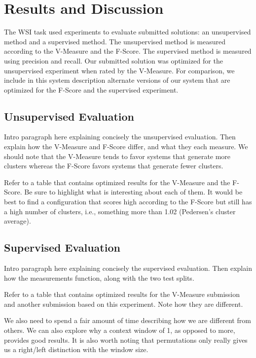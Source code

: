 \documentclass[11pt]{article}
\begin{document}
\section{Results and Discussion}

The WSI task used experiments to evaluate submitted solutions: an unsupervised
method and a supervised method.  The unsupervised method is measured according
to the V-Measure and the F-Score.  The supervised method is measured using
precision and recall.  Our submitted solution was optimized for the unsupervised
experiment when rated by the V-Measure.  For comparison, we include in this
system description alternate versions of our system that are optimized for the
F-Score and the supervised experiment.

\subsection{Unsupervised Evaluation}

Intro paragraph here explaining concisely the unsupervised evaluation.  Then
explain how the V-Measure \cite{rosenberg07vmeasure} and F-Score differ, and
what they each measure.  We should note that the V-Measure tends to favor
systems that generate more clusters whereas the F-Score favors systems that
generate fewer clusters. 

Refer to a table that contains optimized results for the V-Measure and the
F-Score.  Be sure to highlight what is interesting about each of them.  It would
be best to find a configuration that scores high according to the F-Score but
still has a high number of clusters, i.e., something more than 1.02 (Pedersen's
cluster average).

\subsection{Supervised Evaluation}

Intro paragraph here explaining concisely the supervised evaluation.  Then
explain how the measurements function, along with the two test splits.  

Refer to a table that contains optimized results for the V-Measure submission
and another submission based on this experiment.  Note how they are different.

We also need to spend a fair amount of time describing how we are different from
others.  We can also explore why a context window of 1, as opposed to more,
provides good results.  It is also worth noting that permutations only really
gives us a right/left distinction with the window size.
\end{document}
